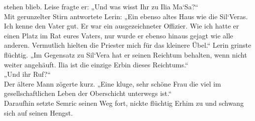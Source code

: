 stehen blieb. Leise fragte er: „Und was wisst Ihr zu Ilia Ma‘Sa?“\\
Mit gerunzelter Stirn antwortete Lerin: „Ein ebenso altes Haus wie die Sil‘Veras. Ich kenne den 
Vater gut. Er war ein ausgezeichneter Offizier. Wie ich hatte er einen Platz im Rat eures Vaters, 
nur wurde er ebenso hinaus gejagt wie alle anderen. Vermutlich hielten die Priester mich für das 
kleinere Übel.“ Lerin grinste flüchtig. „Im Gegensatz zu Sil‘Vera hat er seinen Reichtum behalten, 
wenn nicht weiter angehäuft. Ilia ist die einzige Erbin dieses Reichtums.“\\
„Und ihr Ruf?“\\
Der ältere Mann zögerte kurz. „Eine kluge, sehr schöne Frau die viel im gesellschaftlichen Leben der 
Oberschicht unterwegs ist.“\\
Daraufhin setzte Semric seinen Weg fort, nickte flüchtig Erhim zu und schwang sich auf seinen 
Hengst.\\



